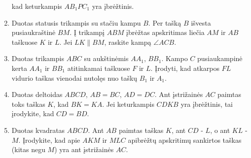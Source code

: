 \begin{enumerate}
    kad keturkampis $AB_1PC_1$ yra įbrėžtinis.
  \item Duotas statusis trikampis su stačiu kampu $B$. Per
    tašką $B$ išvesta pusiaukraštinė $BM$. Į trikampį $ABM$
    įbrėžtas apskritimas liečia $AM$ ir $AB$ taškuose $K$ ir
    $L$. Jei $LK\parallel{BM}$, raskite kampą $\angle ACB$.
  \item Duotas trikampis $ABC$ su aukštinėmis $AA_1$, $BB_1$.
    Kampo $C$ pusiaukampinė kerta $AA_1$ ir $BB_1$ atitinkamai
    taškuose $F$ ir $L$. Įrodyti, kad atkarpos $FL$ vidurio
    taškas vienodai nutolęs nuo taškų $B_1$ ir $A_1$.
  \item Duotas deltoidas $ABCD$, $AB=BC$, $AD=DC$. Ant
    įstrižainės $AC$ paimtas toks taškas $K$, kad $BK = KA$.
    Jei keturkampis $CDKB$ yra  įbrėžtinis, tai įrodykite, kad
    $CD = BD$.
  \item Duotas kvadratas $ABCD$. Ant $AB$ paimtas taškas $K$,
    ant $CD$ - $L$, o ant $KL$ - $M$. Įrodykite, kad apie
    $AKM$ ir $MLC$ apibrėžtų apskritimų sankirtos taškas
    (kitas negu $M$) yra ant įstrižainės $AC$.

\end{enumerate}
